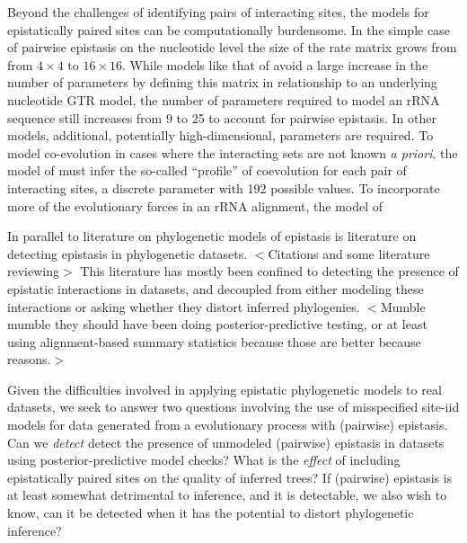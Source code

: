 \documentclass[11pt]{article}
\begin{document}
Beyond the challenges of identifying pairs of interacting sites, the models for epistatically paired sites can be computationally burdensome.
In the simple case of pairwise epistasis on the nucleotide level the size of the rate matrix grows from from $4 \times 4$ to $16 \times 16$.
While models like that of \citet{nasrallah2013phylogenetic} avoid a large increase in the number of parameters by defining this matrix in relationship to an underlying nucleotide GTR model, the number of parameters required to model an rRNA sequence still increases from 9 to 25 to account for pairwise epistasis.
In other models, additional, potentially high-dimensional, parameters are required.
To model co-evolution in cases where the interacting sets are not known \textit{a priori}, the model of \citet{meyer2019simultaneous} must infer the so-called ``profile'' of coevolution for each pair of interacting sites, a discrete parameter with 192 possible values.
To incorporate more of the evolutionary forces in an rRNA alignment, the model of \citet{golden2020evolutionary}



In parallel to literature on phylogenetic models of epistasis is literature on detecting epistasis in phylogenetic datasets.
$<$Citations and some literature reviewing$>$
This literature has mostly been confined to detecting the presence of epistatic interactions in datasets, and decoupled from either modeling these interactions or asking whether they distort inferred phylogenies.
$<$Mumble mumble they should have been doing posterior-predictive testing, or at least using alignment-based summary statistics because those are better because reasons.$>$

Given the difficulties involved in applying epistatic phylogenetic models to real datasets, we seek to answer two questions involving the use of misspecified site-iid models for data generated from a evolutionary process with (pairwise) epistasis.
Can we \textit{detect} detect the presence of unmodeled (pairwise) epistasis in datasets using posterior-predictive model checks?
What is the \textit{effect} of including epistatically paired sites on the quality of inferred trees?
If (pairwise) epistasis is at least somewhat detrimental to inference, and it is detectable, we also wish to know, can it be detected when it has the potential to distort phylogenetic inference?
\end{document}
